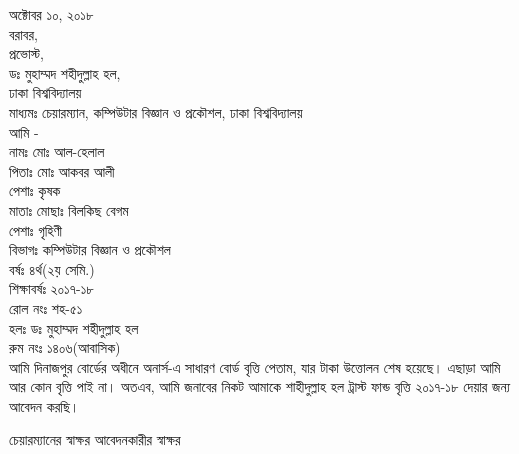 \documentclass[a4paper]{article}
\begin{document}
\fontsize{17}{20}
\selectfont
\vfill
\noindent
অক্টোবর ১০, ২০১৮\\ 

\noindent
বরাবর,\\ 
প্রভোস্ট,\\ 
ডঃ মুহাম্মদ শহীদুল্লাহ হল,\\
ঢাকা বিশ্ববিদ্যালয়\\

\noindent
মাধ্যমঃ চেয়ারম্যান, কম্পিউটার বিজ্ঞান ও প্রকৌশল, ঢাকা বিশ্ববিদ্যালয়\\

\noindent
আমি - \\
নামঃ মোঃ আল-হেলাল\\
পিতাঃ মোঃ আকবর আলী\\
পেশাঃ কৃষক\\ 
মাতাঃ মোছাঃ বিলকিছ বেগম\\
পেশাঃ গৃহিণী\\
বিভাগঃ কম্পিউটার বিজ্ঞান ও প্রকৌশল\\
বর্ষঃ ৪র্থ(২য় সেমি.)\\
শিক্ষাবর্ষঃ ২০১৭-১৮\\
রোল নংঃ শহ-৫১\\
হলঃ ডঃ মুহাম্মদ শহীদুল্লাহ হল\\
রুম নংঃ ১৪০৬(আবাসিক)\\ 

\noindent
আমি দিনাজপুর বোর্ডের অধীনে  অনার্স-এ সাধারণ বোর্ড বৃত্তি পেতাম, যার টাকা উত্তোলন শেষ হয়েছে। এছাড়া আমি আর কোন বৃত্তি পাই না। অতএব, আমি জনাবের নিকট আমাকে শাহীদুল্লাহ হল ট্রাস্ট ফান্ড বৃত্তি ২০১৭-১৮ দেয়ার জন্য আবেদন করছি। 

\vspace{1.9cm}

চেয়ারম্যানের স্বাক্ষর \hfill আবেদনকারীর স্বাক্ষর
\end{document}
